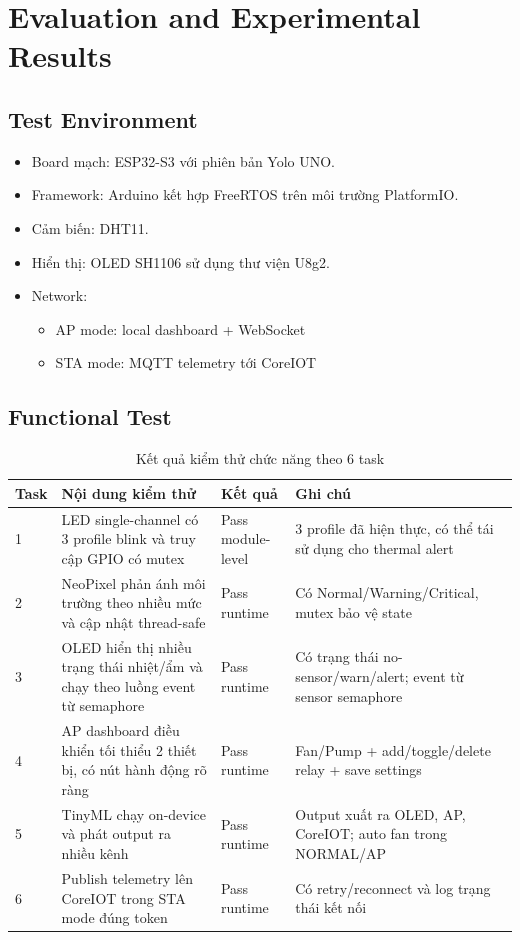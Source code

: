 \section{Evaluation and Experimental Results}

\subsection{Test Environment}
\begin{itemize}
    \item Board mạch: ESP32-S3 với phiên bản Yolo UNO.
    \item Framework: Arduino kết hợp FreeRTOS trên môi trường PlatformIO.
    \item Cảm biến: DHT11.
    \item Hiển thị: OLED SH1106 sử dụng thư viện U8g2.
    \item Network:
    \begin{itemize}
        \item AP mode: local dashboard + WebSocket
        \item STA mode: MQTT telemetry tới CoreIOT
    \end{itemize}
\end{itemize}

\subsection{Functional Test}
\begin{table}[H]
\centering
\begin{tabular}{|p{1.6cm}|p{6.8cm}|p{2.8cm}|p{3.5cm}|}
\hline
\textbf{Task} & \textbf{Nội dung kiểm thử} & \textbf{Kết quả} & \textbf{Ghi chú} \\
\hline
1 & LED single-channel có 3 profile blink và truy cập GPIO có mutex & Pass module-level & 3 profile đã hiện thực, có thể tái sử dụng cho thermal alert \\
\hline
2 & NeoPixel phản ánh môi trường theo nhiều mức và cập nhật thread-safe & Pass runtime & Có Normal/Warning/Critical, mutex bảo vệ state \\
\hline
3 & OLED hiển thị nhiều trạng thái nhiệt/ẩm và chạy theo luồng event từ semaphore & Pass runtime & Có trạng thái no-sensor/warn/alert; event từ sensor semaphore \\
\hline
4 & AP dashboard điều khiển tối thiểu 2 thiết bị, có nút hành động rõ ràng & Pass runtime & Fan/Pump + add/toggle/delete relay + save settings \\
\hline
5 & TinyML chạy on-device và phát output ra nhiều kênh & Pass runtime & Output xuất ra OLED, AP, CoreIOT; auto fan trong NORMAL/AP \\
\hline
6 & Publish telemetry lên CoreIOT trong STA mode đúng token & Pass runtime & Có retry/reconnect và log trạng thái kết nối \\
\hline
\end{tabular}
\caption{Kết quả kiểm thử chức năng theo 6 task}
\label{tab:functional-results}
\end{table}

